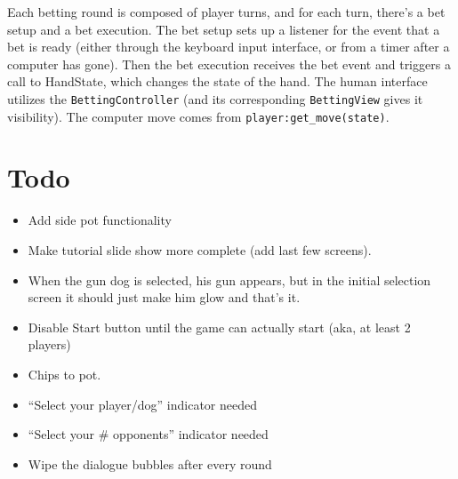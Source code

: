 \documentclass[10pt]{article}
\begin{document}
Each betting round is composed of player turns, and for each turn,
there's a bet setup and a bet execution. The bet setup sets up a
listener for the event that a bet is ready (either through the
keyboard input interface, or from a timer after a computer has
gone). Then the bet execution receives the bet event and triggers a
call to HandState, which changes the state of the hand. The human
interface utilizes the \verb^BettingController^ (and its corresponding
\verb^BettingView^ gives it visibility). The computer move comes from
\verb^player:get_move(state)^.

\section*{Todo}
\begin{itemize}
\item Add side pot functionality
\item Make tutorial slide show more complete (add last few screens).
\item When the gun dog is selected, his gun appears, but in the
  initial selection screen it should just make him glow and that's it.
\item Disable Start button until the game can actually start (aka, at
  least 2 players)
\item Chips to pot.
\item ``Select your player/dog'' indicator needed
\item ``Select your \# opponents'' indicator needed
\item Wipe the dialogue bubbles after every round
\end{itemize}
\end{document}
